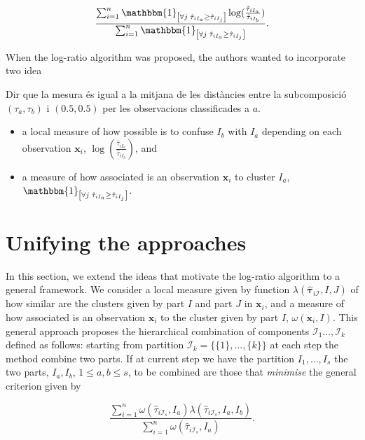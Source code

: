 \documentclass[10pt, a4paper]{article}
\newcommand{\m}[1]{\boldsymbol{#1}}
\begin{document}
\[
\frac{\sum_{i=1}^n \mathbbm{1}_{\left[ \forall j\; \hat{\tau}_{i I_{a}} \geq \hat{\tau}_{iI_j} \right]} \log( \frac{ \hat{\tau}_{iI_a} }{ \hat{\tau}_{iI_b} })}{\sum_{i=1}^n \mathbbm{1}_{\left[ \forall j\; \hat{\tau}_{i I_{a}} \geq \hat{\tau}_{iI_j} \right]}}.
\]

When the log-ratio algorithm was proposed, the authors wanted to incorporate two idea

{\color{red} Dir que la mesura és igual a la mitjana de les distàncies entre la subcomposició $(\tau_a, \tau_b)$ i $(0.5,0.5)$ per les observacions classificades a $a$.}

\begin{itemize}
\item a local measure of how possible is to confuse $I_b$ with $I_a$ depending on each observation $\m x_i$, $\log( \frac{ \hat{\tau}_{iI_a} }{ \hat{\tau}_{iI_b} })$, and
\item a measure of how associated is an observation $\m x_i$ to cluster $I_a$, $\mathbbm{1}_{\left[ \forall j\; \hat{\tau}_{i I_{a}} \geq \hat{\tau}_{iI_j} \right]}$.
\end{itemize}

\section{Unifying the approaches}

In this section, we extend the ideas that motivate the log-ratio algorithm to a general framework. We consider a local measure given by function $\lambda(\hat{\m\tau}_{i \mathcal{I}}, I, J)$ of how similar are the clusters given by part $I$ and part $J$ in $\m x_i$, and a measure of how associated is an observation $\m x_i$ to the cluster given by part $I$, $\omega(\m x_i, I)$. This general approach proposes the hierarchical combination of components $\mathcal{I}_1 \dots, \mathcal{I}_k$ defined as follows: starting from partition $\mathcal{I}_k = \{\{1\},\dots, \{k\}\}$ at each step the method combine two parts. If at current step we have the partition  $I_1, \dots, I_s$ the two parts, $I_a, I_b$, $1 \leq a,b \leq s$,  to be combined are those that \emph{minimise} the general criterion given by

\begin{equation}\label{unifying_equation}
\frac{\sum_{i=1}^n \omega(\hat{\tau}_{i \mathcal{I}_s}, I_a) \lambda(\hat{\tau}_{i \mathcal{I}_s}, I_a, I_b)}{\sum_{i=1}^n \omega(\hat{\tau}_{i \mathcal{I}_s}, I_a) }.
\end{equation}
\end{document}
